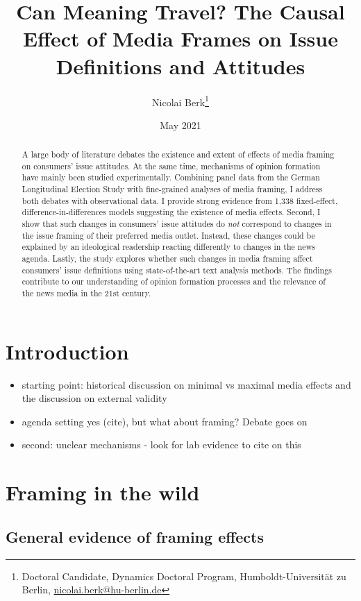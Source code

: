 \documentclass{article}
\title{Can Meaning Travel? The Causal Effect of Media Frames on Issue Definitions and Attitudes}
\author{Nicolai Berk\footnote{Doctoral Candidate, Dynamics Doctoral Program, Humboldt-Universität zu Berlin, \href{mailto:nicolai.berk@hu-berlin.de}{nicolai.berk@hu-berlin.de}}}
\date{May 2021}
\begin{document}
\maketitle

\begin{abstract}
    A large body of literature debates the existence and extent of effects of media framing on consumers' issue attitudes. At the same time, mechanisms of opinion formation have mainly been studied experimentally. Combining panel data from the German Longitudinal Election Study with fine-grained analyses of media framing, I address both debates with observational data. I provide strong evidence from 1,338 fixed-effect, difference-in-differences models suggesting the existence of media effects. Second, I show that such changes in consumers' issue attitudes do \textit{not} correspond to changes in the issue framing of their preferred media outlet. Instead, these changes could be explained by an ideological readership reacting differently to changes in the news agenda. Lastly, the study explores whether such changes in media framing affect consumers' issue definitions using state-of-the-art text analysis methods. The findings contribute to our understanding of opinion formation processes and the relevance of the news media in the 21st century.
\end{abstract}


\section{Introduction}

\begin{itemize}
  \item starting point: historical discussion on minimal vs maximal media effects and the discussion on external validity
  \item agenda setting yes (cite), but what about framing? Debate goes on
  \item second: unclear mechanisms - look for lab evidence to cite on this
\end{itemize}


\section{Framing in the wild}

\subsection{General evidence of framing effects}
\end{document}
